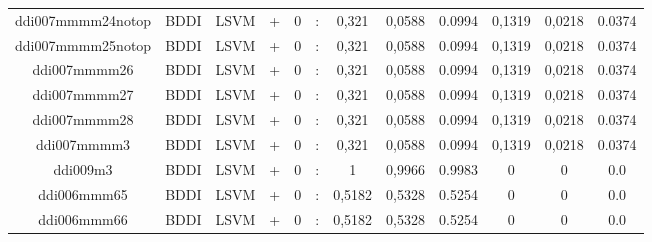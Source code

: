 \documentclass[a4paper]{article}
\begin{document}
\begin{landscape}
\begin{center}
\begin{tabular}{ |c|c|c|c|c|c|c|c|c|c|c|c|}
 	
 
 	
 		
 		\small{ ddi007mmmm24notop } & BDDI & LSVM & +  &  0 &  :  &  0,321 & 0,0588 & 0.0994  &  0,1319 & 0,0218 & 0.0374 \\
 		

 	
 
 	
 		
 		\small{ ddi007mmmm25notop } & BDDI & LSVM & +  &  0 &  :  &  0,321 & 0,0588 & 0.0994  &  0,1319 & 0,0218 & 0.0374 \\
 		

 	
 
 	
 		
 		\small{ ddi007mmmm26 } & BDDI & LSVM & +  &  0 &  :  &  0,321 & 0,0588 & 0.0994  &  0,1319 & 0,0218 & 0.0374 \\
 		

 	
 
 	
 		
 		\small{ ddi007mmmm27 } & BDDI & LSVM & +  &  0 &  :  &  0,321 & 0,0588 & 0.0994  &  0,1319 & 0,0218 & 0.0374 \\
 		

 	
 
 	
 		
 		\small{ ddi007mmmm28 } & BDDI & LSVM & +  &  0 &  :  &  0,321 & 0,0588 & 0.0994  &  0,1319 & 0,0218 & 0.0374 \\
 		

 	
 
 	
 		
 		\small{ ddi007mmmm3 } & BDDI & LSVM & +  &  0 &  :  &  0,321 & 0,0588 & 0.0994  &  0,1319 & 0,0218 & 0.0374 \\
 		

 	
 
 	
 		
 		\small{ ddi009m3 } & BDDI & LSVM & +  &  0 &  :  &  1 & 0,9966 & 0.9983  &  0 & 0 & 0.0 \\
 		

 	
 
 	
 		
 		\small{ ddi006mmm65 } & BDDI & LSVM & +  &  0 &  :  &  0,5182 & 0,5328 & 0.5254  &  0 & 0 & 0.0 \\
 		

 	
 
 	
 		
 		\small{ ddi006mmm66 } & BDDI & LSVM & +  &  0 &  :  &  0,5182 & 0,5328 & 0.5254  &  0 & 0 & 0.0 \\
 		

 	
 

\end{tabular}
\end{center}
\end{landscape}
\end{document}
